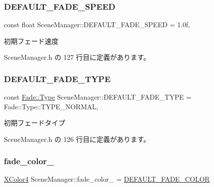 \subsubsection{\texorpdfstring{D\+E\+F\+A\+U\+L\+T\+\_\+\+F\+A\+D\+E\+\_\+\+S\+P\+E\+ED}{DEFAULT\_FADE\_SPEED}}
{\footnotesize\ttfamily const float Scene\+Manager\+::\+D\+E\+F\+A\+U\+L\+T\+\_\+\+F\+A\+D\+E\+\_\+\+S\+P\+E\+ED = 1.\+0f\hspace{0.3cm}{\ttfamily [static]}, {\ttfamily [private]}}



初期フェード速度 



 Scene\+Manager.\+h の 127 行目に定義があります。

\mbox{\label{class_scene_manager_ab87f30ef7e11305bb4e3400b41225c22}} 
\subsubsection{\texorpdfstring{D\+E\+F\+A\+U\+L\+T\+\_\+\+F\+A\+D\+E\+\_\+\+T\+Y\+PE}{DEFAULT\_FADE\_TYPE}}
{\footnotesize\ttfamily const \mbox{\hyperlink{class_fade_ac06f27215b454aa05b93c236476d6e80}{Fade\+::\+Type}} Scene\+Manager\+::\+D\+E\+F\+A\+U\+L\+T\+\_\+\+F\+A\+D\+E\+\_\+\+T\+Y\+PE = Fade\+::\+Type\+::\+T\+Y\+P\+E\+\_\+\+N\+O\+R\+M\+AL\hspace{0.3cm}{\ttfamily [static]}, {\ttfamily [private]}}



初期フェードタイプ 



 Scene\+Manager.\+h の 126 行目に定義があります。

\mbox{\label{class_scene_manager_a978b815258c4591f81a16995484fe9fb}} 
\subsubsection{\texorpdfstring{fade\+\_\+color\+\_\+}{fade\_color\_}}
{\footnotesize\ttfamily \mbox{\hyperlink{_vector3_d_8h_a680c30c4a07d86fe763c7e01169cd6cc}{X\+Color4}} Scene\+Manager\+::fade\+\_\+color\+\_\+ = \mbox{\hyperlink{class_scene_manager_a8b6874644ba8998b0db76780d56f371f}{D\+E\+F\+A\+U\+L\+T\+\_\+\+F\+A\+D\+E\+\_\+\+C\+O\+L\+OR}}\hspace{0.3cm}{\ttfamily [private]}}



